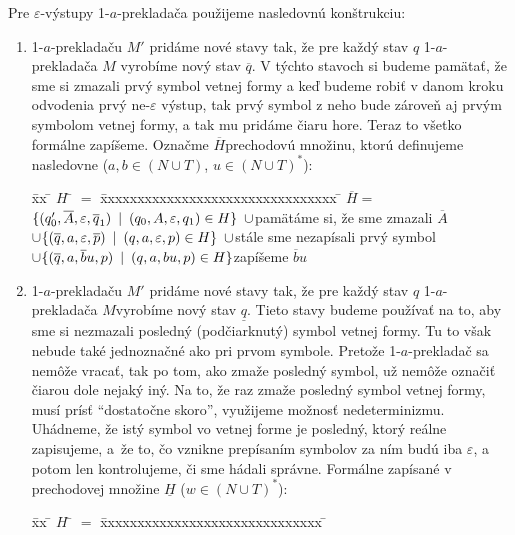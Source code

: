 \begin{dokaz}
\begin{enumerate}
    Pre $\varepsilon$-výstupy 1-$a$-prekladača použijeme nasledovnú
    konštrukciu:
    \begin{enumerate}
      \item 1-$a$-prekladaču $M'$ pridáme nové stavy tak, že pre každý
      stav $q$ 1-$a$-prekladača $M$ vyrobíme nový stav $\overline{q}$. V
      týchto stavoch si budeme pamätať, že sme si zmazali prvý symbol
      vetnej formy a keď budeme robiť v danom kroku odvodenia prvý
      ne-$\varepsilon$ výs\-tup, tak prvý symbol z neho bude zároveň aj
      prvým symbolom vetnej formy, a tak mu pridáme čiaru hore. Teraz to
      všetko formálne zapíšeme. Označme $\overline{H}$prechodovú
      množinu, ktorú definujeme nasledovne ($a,b\in (N\cup T)$, $u\in(N\cup T)^*$):
      \begin{tabbing}
        \= xx \= $H$ \= $=$ \= xxxxxxxxxxxxxxxxxxxxxxxxxxxxxxxx \= \kill
        \>\>$\overline{H}$\>$=$\>
        $\{(q'_0,\overline{A},\varepsilon,\overline{q}_1)\enspace |\enspace
        (q_0,A,\varepsilon,q_1)\in H\}\enspace\cup$\>pamätáme si, že sme
        zmazali $\overline{A}$
        \\ \>\>\>$\cup$\>$\{(\overline{q},a,\varepsilon,\overline{p})\enspace |\enspace
        (q,a,\varepsilon,p)\in H\}\enspace\cup$\>stále sme nezapísali prvý
        symbol \\ \>\>\>$\cup$\>$\{(\overline{q},a,\overline{b}u,p)\enspace |\enspace
        (q,a,bu,p)\in H\}$\>zapíšeme $\overline{b}u$
      \end{tabbing}
      \item 1-$a$-prekladaču $M'$ pridáme nové stavy tak, že pre každý
      stav $q$ 1-$a$-prekladača $M$\linebreak vyrobíme nový stav $\underline{q}$.
      Tieto stavy budeme používať na to, aby sme si nezmazali posledný
      (podčiarknutý) symbol vetnej formy. Tu to však nebude také
      jedno\-znač\-né ako pri prvom symbole. Pretože 1-$a$-prekladač sa
      nemôže vracať, tak po tom, ako zmaže posledný symbol, už nemôže
      označiť čiarou dole nejaký iný. Na to, že raz zmaže posledný
      symbol vetnej formy, musí prísť ``dostatočne skoro'', využijeme
      možnosť nedeterminizmu. Uhádneme, že istý symbol vo vetnej forme
      je posledný, ktorý reálne zapisujeme, \mbox{a že} to, čo vznikne
      prepísaním symbolov za ním budú iba $\varepsilon$, a potom len
      kontrolujeme, či sme hádali správne. Formálne zapísané v
      prechodovej množine $\underline{H}$ ($w\in(N\cup T)^*$):
      \begin{tabbing}
        \= xx \= $H$ \= $=$ \= xxxxxxxxxxxxxxxxxxxxxxxxxxxxxx \= \kill

\end{tabbing}
\end{enumerate}
\end{enumerate}
\end{dokaz}
